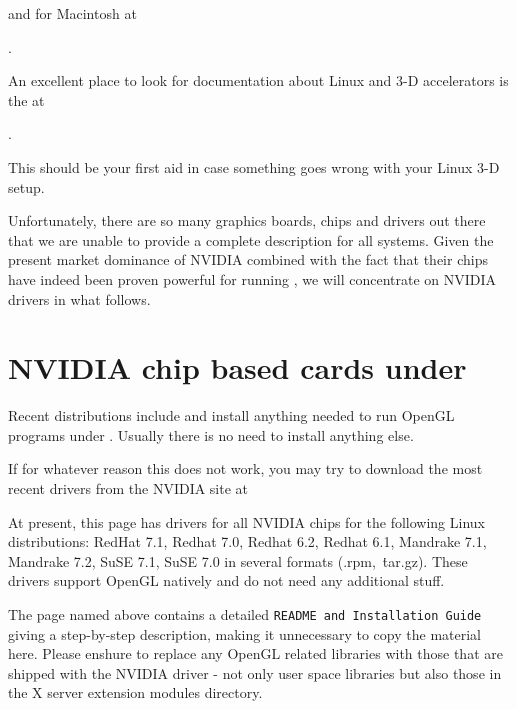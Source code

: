  \noindent
 and for Macintosh at
  \medskip

.
 \medskip

 \noindent
An excellent place to look for documentation about Linux and 3-D accelerators is the {\itLinux {} \HOWTO} at
 \medskip

.
 \medskip

\noindent
 This should be your first aid in case something goes wrong with your Linux 3-D setup.

Unfortunately, there are so many graphics boards, chips and drivers out there that we are
unable to provide a complete description for all systems. Given the present market
dominance of NVIDIA combined with the fact that their chips have indeed been proven
powerful for running \FlightGear{}, we will concentrate on NVIDIA
drivers in what follows.

\section{NVIDIA chip based cards under \label{nvidialinux}}
Recent  distributions include and install anything needed to run OpenGL
programs under . Usually there is no need to install anything else.

If for whatever reason this does not work, you may try to download the most recent
drivers from the NVIDIA site at
 \medskip

 \medskip

 \noindent
At present, this page has drivers for all NVIDIA chips for the following Linux
distributions: RedHat 7.1, Redhat 7.0, Redhat 6.2, Redhat
6.1, Mandrake 7.1, Mandrake 7.2, SuSE 7.1, SuSE 7.0 in several formats (.rpm,\ \.tar.gz).
These drivers support OpenGL natively and do not need any additional stuff.

The page named above contains a detailed \texttt{README and Installation Guide} giving a
step-by-step description, making it unnecessary to copy the material here.
Please enshure to replace any OpenGL related libraries with those that are
shipped with the NVIDIA driver - not only user space libraries but also
those in the X server extension modules directory.

